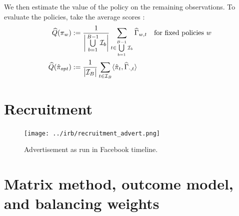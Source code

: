 \documentclass[letterpaper, 12pt, parskip=full,DIV=12]{scrartcl}
\begin{document}
We then estimate the value of the policy on the remaining observations. To evaluate the policies, take the average scores :
    \begin{align*}
          \widehat{Q}({\pi}_{w})  &:= \frac{1}{\bigg{\lvert} \bigcup\limits_{b=1}^{B-1} \mathcal{I}_{b} \bigg{\rvert}} \sum_{t \in \bigcup\limits_{b=1}^{B-1} \mathcal{I}_{b} } \widehat{\Gamma}_{w,t} \quad \text{for fixed policies $w$}\\
                     \widehat{Q}(\hat{\pi}_{opt})  &:= \frac{1}{\big{\lvert}  \mathcal{I}_{B} \big{\rvert}} \sum_{t \in \mathcal{I}_{B} }
                      \langle \hat{\pi}_{t}, \widehat{\Gamma}_{\cdot, t}  \rangle 
    \end{align*}










\clearpage



\clearpage
\appendix

\section{Recruitment}\label{recruitment}

\begin{figure}[htb]
\centering
\caption{Advertisement as run in Facebook timeline.}
\label{fig:ad}
\texttt{[image: ../irb/recruitment\_advert.png]}
\end{figure}


\section{Matrix method, outcome model, and balancing weights}
\end{document}
